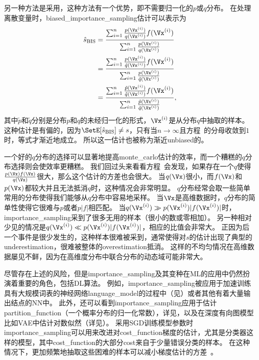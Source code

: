 另一种方法是采用，这种方法有一个优势，即不需要归一化的$p$或$q$分布。
在处理离散变量时，\gls{biased_importance_sampling}估计可以表示为
\begin{align}
\label{eqn:bis}
\hat{s}_{\text{BIS}} & = \frac{\sum_{i=1}^{n} \frac{p(\Vx^{(i)})}{q(\Vx^{(i)})} f(\Vx^{(i)})}{\sum_{i=1}^{n}\frac{p(\Vx^{(i)})}{q(\Vx^{(i)})}} \\
& = \frac{\sum_{i=1}^{n} \frac{p(\Vx^{(i)})}{\tilde{q}(\Vx^{(i)})} f(\Vx^{(i)})}{\sum_{i=1}^{n}\frac{p(\Vx^{(i)})}{\tilde{q}(\Vx^{(i)})}} \\
& = \frac{\sum_{i=1}^{n} \frac{\tilde{p}(\Vx^{(i)})}{\tilde{q}(\Vx^{(i)})} f(\Vx^{(i)})}{\sum_{i=1}^{n}\frac{\tilde{p}(\Vx^{(i)})}{\tilde{q}(\Vx^{(i)})}},
\end{align}
其中$\tilde{p}$和$\tilde{q}$分别是分布${p}$和${q}$的未经归一化的形式，$\Vx^{(i)}$是从分布${q}$中抽取的样本。
这种估计是有偏的，因为$\SetE[\hat{s}_{\text{BIS}}]\neq s$，只有当$n \to \infty$且方程~的分母收敛到$1$时，等式才渐近地成立。
所以这一估计也被称为渐近\gls{unbiased}的。   


一个好的$q$分布的选择可以显著地提高\gls{monte_carlo}估计的效率，而一个糟糕的$q$分布选择则会使效率更糟糕。
我们回过头来看看方程~会发现，如果存在一个$q$使得$\frac{p(\Vx)f(\Vx)}{q(\Vx)}$很大，那么这个估计的方差也会很大。
当$q(\Vx)$很小，而$f(\Vx)$和$p(\Vx)$都较大并且无法抵消$q$时，这种情况会非常明显。
$q$分布经常会取一些简单常用的分布使得我们能够从$q$分布中容易地采样。
当$\Vx$是高维数据时，$q$分布的简单性使得它很难与$p$或者$p\vert f\vert$相匹配。   
当$q(\Vx^{(i)})\gg p(\Vx^{(i)}) \vert f(\Vx^{(i)})\vert $时，\gls{importance_sampling}采到了很多无用的样本（很小的数或零相加）。
另一种相对少见的情况是$q(\Vx^{(i)})\ll p(\Vx^{(i)}) \vert f(\Vx^{(i)})\vert $，相应的比值会非常大。
正因为后一个事件是很少发生的，这种样本很难被采到，通常使得对$s$的估计出现了典型的\gls{underestimation}，很难被整体的\gls{overestimation}抵消。
这样的不均匀情况在高维数据屡见不鲜，因为在高维度分布中联合分布的动态域可能非常大。


尽管存在上述的风险，但是\gls{importance_sampling}及其变种在\gls{ML}的应用中仍然扮演着重要的角色，包括\gls{DL}算法。
例如，\gls{importance_sampling}被应用于加速训练具有大规模词表的神经网络\gls{language_model}的过程中（见）或者其他有着大量输出结点的\gls{NN}中。   
此外，还可以看到\gls{importance_sampling}应用于估计\gls{partition_function}（一个概率分布的归一化常数），详见，以及在深度有向图模型比如\gls{VAE}中估计对数似然（详见）。
采用\gls{SGD}训练模型参数时\gls{importance_sampling}可以用来改进对\gls{cost_function}梯度的估计，尤其是分类器这样的模型，其中\gls{cost_function}的大部分\gls{cost}来自于少量错误分类的样本。    
在这种情况下，更加频繁地抽取这些困难的样本可以减小梯度估计的方差~\citep{Hinton-et-al-2006}。 


